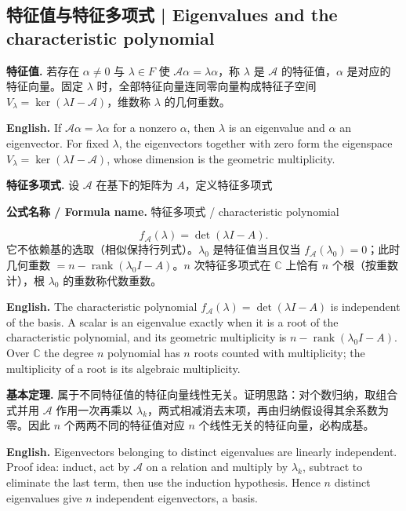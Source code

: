 \documentclass[UTF8,11pt,a4paper]{ctexart}
\newcommand{\EN}[1]{\par\noindent\textbf{English.} #1\par}
\newcommand{\FORMULA}[2]{\par\noindent\textbf{公式名称 / Formula name.} #1 / #2\par}
\begin{document}
\subsection{特征值与特征多项式 | Eigenvalues and the characteristic polynomial}
\noindent\textbf{特征值.} 若存在 $\alpha\ne0$ 与 $\lambda\in F$ 使 $\mathcal A\alpha=\lambda\alpha$，称 $\lambda$ 是 $\mathcal A$ 的特征值，$\alpha$ 是对应的特征向量。固定 $\lambda$ 时，全部特征向量连同零向量构成特征子空间 $V_\lambda=\ker(\lambda I-\mathcal A)$，维数称 $\lambda$ 的几何重数。
\EN{If $\mathcal A\alpha=\lambda\alpha$ for a nonzero $\alpha$, then $\lambda$ is an eigenvalue and $\alpha$ an eigenvector. For fixed $\lambda$, the eigenvectors together with zero form the eigenspace $V_\lambda=\ker(\lambda I-\mathcal A)$, whose dimension is the geometric multiplicity.}
\noindent\textbf{特征多项式.} 设 $\mathcal A$ 在基下的矩阵为 $A$，定义特征多项式
\FORMULA{特征多项式}{characteristic polynomial}
\[
f_{\mathcal A}(\lambda)=\det(\lambda I-A).
\]
它不依赖基的选取（相似保持行列式）。$\lambda_0$ 是特征值当且仅当 $f_{\mathcal A}(\lambda_0)=0$；此时几何重数 $=n-\operatorname{rank}(\lambda_0I-A)$。$n$ 次特征多项式在 $\mathbb C$ 上恰有 $n$ 个根（按重数计），根 $\lambda_0$ 的重数称代数重数。
\EN{The characteristic polynomial $f_{\mathcal A}(\lambda)=\det(\lambda I-A)$ is independent of the basis. A scalar is an eigenvalue exactly when it is a root of the characteristic polynomial, and its geometric multiplicity is $n-\operatorname{rank}(\lambda_0I-A)$. Over $\mathbb C$ the degree $n$ polynomial has $n$ roots counted with multiplicity; the multiplicity of a root is its algebraic multiplicity.}
\noindent\textbf{基本定理.} 属于不同特征值的特征向量线性无关。证明思路：对个数归纳，取组合式并用 $\mathcal A$ 作用一次再乘以 $\lambda_k$，两式相减消去末项，再由归纳假设得其余系数为零。因此 $n$ 个两两不同的特征值对应 $n$ 个线性无关的特征向量，必构成基。
\EN{Eigenvectors belonging to distinct eigenvalues are linearly independent. Proof idea: induct, act by $\mathcal A$ on a relation and multiply by $\lambda_k$, subtract to eliminate the last term, then use the induction hypothesis. Hence $n$ distinct eigenvalues give $n$ independent eigenvectors, a basis.}
\end{document}
